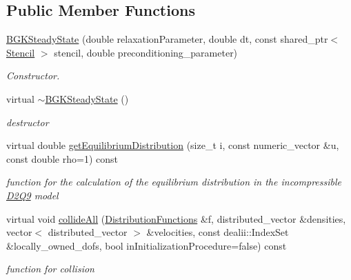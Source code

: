 \subsection*{Public Member Functions}
\begin{DoxyCompactItemize}
\item 
\hyperlink{classnatrium_1_1BGKSteadyState_aa8521523f8603fdc5a391d6e6388667c}{BGKSteadyState} (double relaxationParameter, double dt, const shared\_\-ptr$<$ \hyperlink{classnatrium_1_1Stencil}{Stencil} $>$ stencil, double preconditioning\_\-parameter)
\begin{DoxyCompactList}\small\item\em Constructor. \item\end{DoxyCompactList}\item 
virtual \hyperlink{classnatrium_1_1BGKSteadyState_ab2c58f1d6b964179a2abeb5f54aa5edc}{$\sim$BGKSteadyState} ()
\begin{DoxyCompactList}\small\item\em destructor \item\end{DoxyCompactList}\item 
virtual double \hyperlink{classnatrium_1_1BGKSteadyState_ad99d9159cc14b5897bea7f145c3b39ca}{getEquilibriumDistribution} (size\_\-t i, const numeric\_\-vector \&u, const double rho=1) const 
\begin{DoxyCompactList}\small\item\em function for the calculation of the equilibrium distribution in the incompressible \hyperlink{classnatrium_1_1D2Q9}{D2Q9} model \item\end{DoxyCompactList}\item 
virtual void \hyperlink{classnatrium_1_1BGKSteadyState_a8554fb624c5a3abe01651747b3d9aeb7}{collideAll} (\hyperlink{classnatrium_1_1DistributionFunctions}{DistributionFunctions} \&f, distributed\_\-vector \&densities, vector$<$ distributed\_\-vector $>$ \&velocities, const dealii::IndexSet \&locally\_\-owned\_\-dofs, bool inInitializationProcedure=false) const 
\begin{DoxyCompactList}\small\item\em function for collision \item\end{DoxyCompactList}\end{DoxyCompactItemize}
